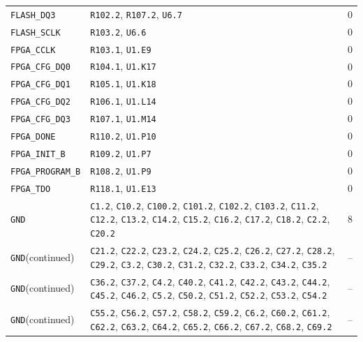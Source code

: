 \documentclass[11pt,a4paper]{article}
\begin{document}
\begin{longtable}{@{}P{48mm}P{109mm}P{10mm}@{}}
\nolinkurl{FLASH_DQ3} & \nolinkurl{R102.2}, \nolinkurl{R107.2}, \nolinkurl{U6.7} & 0 \\
\nolinkurl{FLASH_SCLK} & \nolinkurl{R103.2}, \nolinkurl{U6.6} & 0 \\
\nolinkurl{FPGA_CCLK} & \nolinkurl{R103.1}, \nolinkurl{U1.E9} & 0 \\
\nolinkurl{FPGA_CFG_DQ0} & \nolinkurl{R104.1}, \nolinkurl{U1.K17} & 0 \\
\nolinkurl{FPGA_CFG_DQ1} & \nolinkurl{R105.1}, \nolinkurl{U1.K18} & 0 \\
\nolinkurl{FPGA_CFG_DQ2} & \nolinkurl{R106.1}, \nolinkurl{U1.L14} & 0 \\
\nolinkurl{FPGA_CFG_DQ3} & \nolinkurl{R107.1}, \nolinkurl{U1.M14} & 0 \\
\nolinkurl{FPGA_DONE} & \nolinkurl{R110.2}, \nolinkurl{U1.P10} & 0 \\
\nolinkurl{FPGA_INIT_B} & \nolinkurl{R109.2}, \nolinkurl{U1.P7} & 0 \\
\nolinkurl{FPGA_PROGRAM_B} & \nolinkurl{R108.2}, \nolinkurl{U1.P9} & 0 \\
\nolinkurl{FPGA_TDO} & \nolinkurl{R118.1}, \nolinkurl{U1.E13} & 0 \\
\nolinkurl{GND} & \nolinkurl{C1.2}, \nolinkurl{C10.2}, \nolinkurl{C100.2}, \nolinkurl{C101.2}, \nolinkurl{C102.2}, \nolinkurl{C103.2}, \nolinkurl{C11.2}, \nolinkurl{C12.2}, \nolinkurl{C13.2}, \nolinkurl{C14.2}, \nolinkurl{C15.2}, \nolinkurl{C16.2}, \nolinkurl{C17.2}, \nolinkurl{C18.2}, \nolinkurl{C2.2}, \nolinkurl{C20.2} & 8 \\
\nolinkurl{GND}\newline (continued) & \nolinkurl{C21.2}, \nolinkurl{C22.2}, \nolinkurl{C23.2}, \nolinkurl{C24.2}, \nolinkurl{C25.2}, \nolinkurl{C26.2}, \nolinkurl{C27.2}, \nolinkurl{C28.2}, \nolinkurl{C29.2}, \nolinkurl{C3.2}, \nolinkurl{C30.2}, \nolinkurl{C31.2}, \nolinkurl{C32.2}, \nolinkurl{C33.2}, \nolinkurl{C34.2}, \nolinkurl{C35.2} & -- \\
\nolinkurl{GND}\newline (continued) & \nolinkurl{C36.2}, \nolinkurl{C37.2}, \nolinkurl{C4.2}, \nolinkurl{C40.2}, \nolinkurl{C41.2}, \nolinkurl{C42.2}, \nolinkurl{C43.2}, \nolinkurl{C44.2}, \nolinkurl{C45.2}, \nolinkurl{C46.2}, \nolinkurl{C5.2}, \nolinkurl{C50.2}, \nolinkurl{C51.2}, \nolinkurl{C52.2}, \nolinkurl{C53.2}, \nolinkurl{C54.2} & -- \\
\nolinkurl{GND}\newline (continued) & \nolinkurl{C55.2}, \nolinkurl{C56.2}, \nolinkurl{C57.2}, \nolinkurl{C58.2}, \nolinkurl{C59.2}, \nolinkurl{C6.2}, \nolinkurl{C60.2}, \nolinkurl{C61.2}, \nolinkurl{C62.2}, \nolinkurl{C63.2}, \nolinkurl{C64.2}, \nolinkurl{C65.2}, \nolinkurl{C66.2}, \nolinkurl{C67.2}, \nolinkurl{C68.2}, \nolinkurl{C69.2} & -- \\

\end{longtable}
\end{document}

